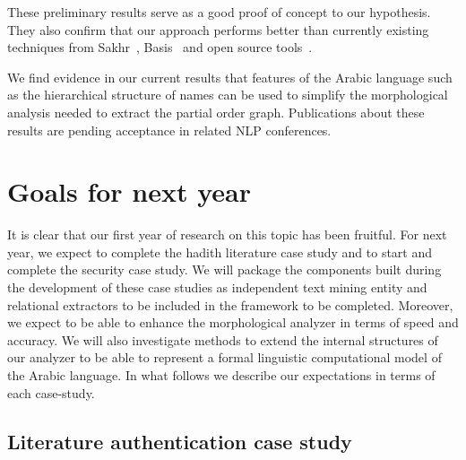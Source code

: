 \documentclass[12pt]{article}
\begin{document}
These preliminary results serve as a good proof of concept to our 
hypothesis. They also confirm that our approach performs better than 
currently existing techniques from Sakhr~\cite{Sak09},
Basis~\cite{Bas09} and open source 
tools~\cite{Col09,Otakar:07,Tim04}.

We find evidence in our current results that features 
of the Arabic language such as the hierarchical structure of
names can be used to simplify the morphological analysis
needed to extract the partial order graph. 
Publications about these results are pending acceptance in 
related NLP conferences. 


\section{Goals for next year}
\label{s:nextyear}

It is clear that our first year of research on this topic has been fruitful. For next year, we expect to complete the hadith literature case study and to start and complete the security case study. We will package the components built during the development of these case studies as independent text mining entity and relational extractors to be included in the framework to be completed. Moreover, we expect to be able to enhance the morphological analyzer in terms of speed and accuracy. We will also investigate methods to extend the internal structures of our analyzer to be able to represent a formal linguistic
computational model of the Arabic language. In what follows we describe our expectations in terms of each case-study.

\subsection{Literature authentication case study}
\label{s:design:lit}

\begin{figure}
\end{figure}
\end{document}
